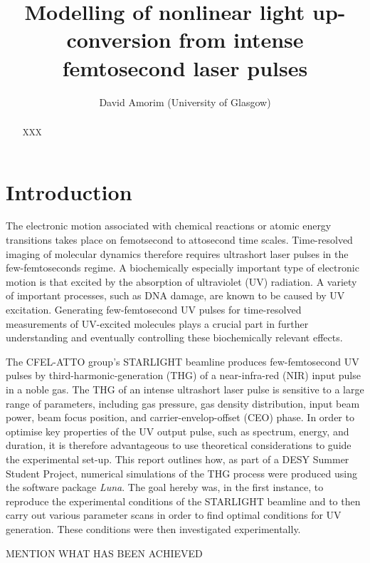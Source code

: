 \documentclass[a4paper]{jpconf}
\begin{document}

\title{Modelling of nonlinear light up-conversion from intense femtosecond laser pulses}
\author{David Amorim (University of Glasgow)}
\address{DESY Summer Student Programme 2023 \\ Group:  Attosecond Science (CFEL-ATTO) \\ Institute: Centre for Free-Electron Laser Science (CFEL)\\ Supervisor: Josina Hahne}

\thispagestyle{plain}
\pagestyle{plain}
\setlength{\footskip}{5pt}

\begin{abstract}
XXX
\end{abstract}


\section{Introduction}
The electronic motion associated with chemical reactions or atomic energy transitions takes place on femotsecond to attosecond time scales. Time-resolved imaging of molecular dynamics therefore requires ultrashort laser pulses in the few-femtoseconds regime. A biochemically especially important type of electronic motion is that excited by the absorption of ultraviolet (UV) radiation. A variety of important processes, such as DNA damage, are known to be caused by UV excitation. Generating few-femtosecond UV pulses for time-resolved measurements of UV-excited molecules plays a crucial part in further understanding and eventually controlling these biochemically relevant effects. \par 
The CFEL-ATTO group's STARLIGHT beamline produces few-femtosecond UV  pulses by third-harmonic-generation (THG) of a near-infra-red (NIR) input pulse in a noble gas. The THG of an intense ultrashort laser pulse is sensitive to a large range of parameters, including gas pressure, gas density distribution, input beam power, beam focus position, and carrier-envelop-offset (CEO) phase. In order to optimise key properties of the UV output pulse, such as spectrum, energy, and duration, it is therefore advantageous to use theoretical considerations to guide the experimental set-up. This report outlines how, as part of a DESY Summer Student Project, numerical simulations of the THG process were produced using the software package \emph{Luna}. The goal hereby was, in the first instance, to reproduce the experimental conditions of the STARLIGHT beamline and to then carry out various parameter scans in order to find optimal conditions for UV generation. These conditions were then investigated experimentally. \par  
MENTION WHAT HAS BEEN ACHIEVED
\end{document}
